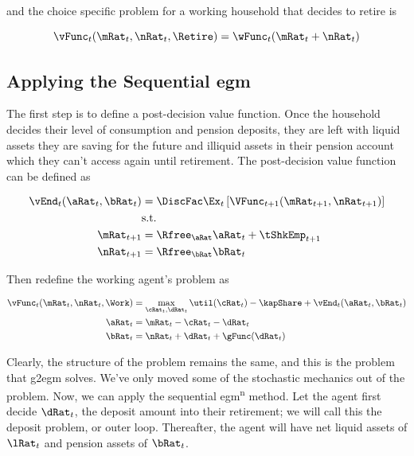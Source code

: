 \documentclass{article}
\begin{document}
and the choice specific problem for a working household that decides to retire is

\begin{equation}
\vFunc_{t}(\mRat_{t}, \nRat_{t}, \Retire) =
    \wFunc_{t}(\mRat_{t}+\nRat_{t})
\end{equation}

\subsection{Applying the Sequential \acrshort{egm}}

The first step is to define a post-decision value function. Once the household decides their level of consumption and pension deposits, they are left with liquid assets they are saving for the future and illiquid assets in their pension account which they can't access again until retirement. The post-decision value function can be defined as

\begin{equation}
\begin{split}
        \vEnd_{t}(\aRat_{t}, \bRat_{t}) & = \DiscFac
        \Ex_{t} \left[ \VFunc_{t+1}(\mRat_{t+1}, \nRat_{t+1}) \right] \\
        & \text{s.t.} \\
        \mRat_{t+1} & = \Rfree_{\aRat} \aRat_{t} + \tShkEmp_{t+1} \\
        \nRat_{t+1} & = \Rfree_{\bRat} \bRat_{t}
    \end{split}
\end{equation}

Then redefine the working agent's problem as

\begin{equation}
\begin{split}
        \vFunc_{t}(\mRat_{t}, \nRat_{t}, \Work) & = \max_{\cRat_{t},
            \dRat_{t}} \util(\cRat_{t})  - \kapShare + \vEnd_{t}(\aRat_{t},
        \bRat_{t}) \\
        \aRat_{t} & = \mRat_{t} - \cRat_{t} - \dRat_{t} \\
        \bRat_{t} & = \nRat_{t} + \dRat_{t} + \gFunc(\dRat_{t}) \\
    \end{split}
\end{equation}

Clearly, the structure of the problem remains the same, and this is the problem that \acrshort{g2egm} solves. We've only moved some of the stochastic mechanics out of the problem. Now, we can apply the sequential \acrshort{egm}\textsuperscript{n} method. Let the agent first decide $\dRat_{t}$, the deposit amount into their retirement; we will call this the deposit problem, or outer loop. Thereafter, the agent will have net liquid assets of $\lRat_{t}$ and pension assets of $\bRat_{t}$.
\end{document}
